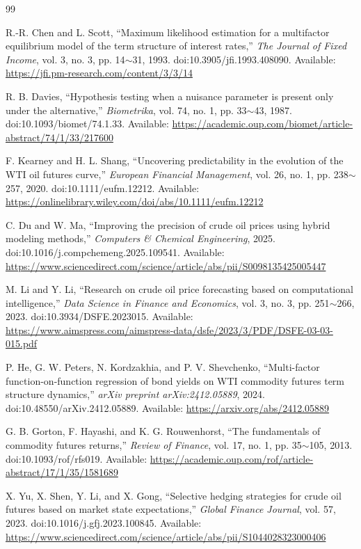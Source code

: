 \documentclass[journal]{IEEEtran}
\newcommand{\rng}{\ensuremath{\sim}}
\begin{document}
\begin{thebibliography}{99}

R.-R. Chen and L. Scott, ``Maximum likelihood estimation for a multifactor equilibrium model of the term structure of interest rates,'' \textit{The Journal of Fixed Income}, vol. 3, no. 3, pp. 14\rng{}31, 1993. doi:10.3905/jfi.1993.408090. Available: \url{https://jfi.pm-research.com/content/3/3/14}

R. B. Davies, ``Hypothesis testing when a nuisance parameter is present only under the alternative,'' \textit{Biometrika}, vol. 74, no. 1, pp. 33\rng{}43, 1987. doi:10.1093/biomet/74.1.33. Available: \url{https://academic.oup.com/biomet/article-abstract/74/1/33/217600}

F. Kearney and H. L. Shang, ``Uncovering predictability in the evolution of the WTI oil futures curve,'' \textit{European Financial Management}, vol. 26, no. 1, pp. 238\rng{}257, 2020. doi:10.1111/eufm.12212. Available: \url{https://onlinelibrary.wiley.com/doi/abs/10.1111/eufm.12212}

C. Du and W. Ma, ``Improving the precision of crude oil prices using hybrid modeling methods,'' \textit{Computers \& Chemical Engineering}, 2025. doi:10.1016/j.compchemeng.2025.109541. Available: \url{https://www.sciencedirect.com/science/article/abs/pii/S0098135425005447}

M. Li and Y. Li, ``Research on crude oil price forecasting based on computational intelligence,'' \textit{Data Science in Finance and Economics}, vol. 3, no. 3, pp. 251\rng{}266, 2023. doi:10.3934/DSFE.2023015. Available: \url{https://www.aimspress.com/aimspress-data/dsfe/2023/3/PDF/DSFE-03-03-015.pdf}

P. He, G. W. Peters, N. Kordzakhia, and P. V. Shevchenko, ``Multi-factor function-on-function regression of bond yields on WTI commodity futures term structure dynamics,'' \textit{arXiv preprint arXiv:2412.05889}, 2024. doi:10.48550/arXiv.2412.05889. Available: \url{https://arxiv.org/abs/2412.05889}

G. B. Gorton, F. Hayashi, and K. G. Rouwenhorst, ``The fundamentals of commodity futures returns,'' \textit{Review of Finance}, vol. 17, no. 1, pp. 35\rng{}105, 2013. doi:10.1093/rof/rfs019. Available: \url{https://academic.oup.com/rof/article-abstract/17/1/35/1581689}

X. Yu, X. Shen, Y. Li, and X. Gong, ``Selective hedging strategies for crude oil futures based on market state expectations,'' \textit{Global Finance Journal}, vol. 57, 2023. doi:10.1016/j.gfj.2023.100845. Available: \url{https://www.sciencedirect.com/science/article/abs/pii/S1044028323000406}


\end{thebibliography}
\end{document}
